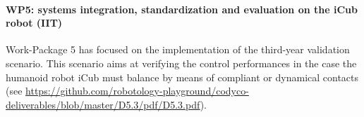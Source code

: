 \paragraph{WP5: systems integration, standardization and evaluation on the iCub robot (IIT)}

Work-Package 5 has focused on the implementation of the third-year validation scenario. This  scenario aims at verifying the control performances in the case the humanoid robot iCub must balance by means of compliant or dynamical contacts (see  \url{https://github.com/robotology-playground/codyco-deliverables/blob/master/D5.3/pdf/D5.3.pdf}). 

